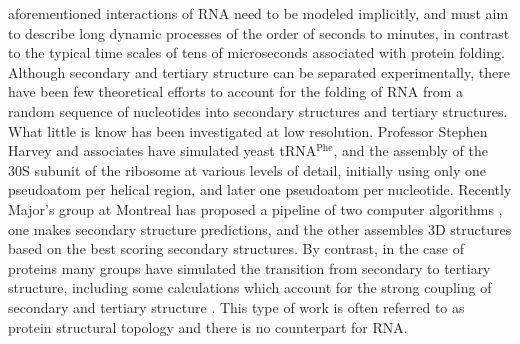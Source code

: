 aforementioned interactions of RNA  need to be modeled implicitly, and
must aim to describe long dynamic processes of the order of seconds to
minutes,  in  contrast   to  the  typical  time  scales   of  tens  of
microseconds associated with protein folding.
Although   secondary   and  tertiary   structure   can  be   separated
experimentally, there have been few theoretical efforts to account for
the  folding  of  RNA  from  a random  sequence  of  nucleotides  into
secondary structures and tertiary  structures. What little is know has
been  investigated at  low  resolution. Professor  Stephen Harvey  and
associates     have     simulated     yeast     tRNA$^{\textrm{Phe}}$,
\cite{malhotra1990}  and  the  assembly  of  the 30S  subunit  of  the
ribosome \cite{stagg2003} at various levels of detail, initially using
only one pseudoatom  per helical region, and later  one pseudoatom per
nucleotide. Recently Major's group at Montreal has proposed a pipeline
of  two computer algorithms  \cite{parisien2008}, one  makes secondary
structure predictions, and the  other assembles 3D structures based on
the best scoring  secondary structures.
By contrast,  in the case of  proteins many groups  have simulated the
transition  from  secondary  to  tertiary  structure,  including  some
calculations which  account for the  strong coupling of  secondary and
tertiary  structure   \cite{westhead1999,  gerstein2003,  meiler2003}.
This type of work is  often referred to as protein structural topology
and there is no counterpart for RNA.

